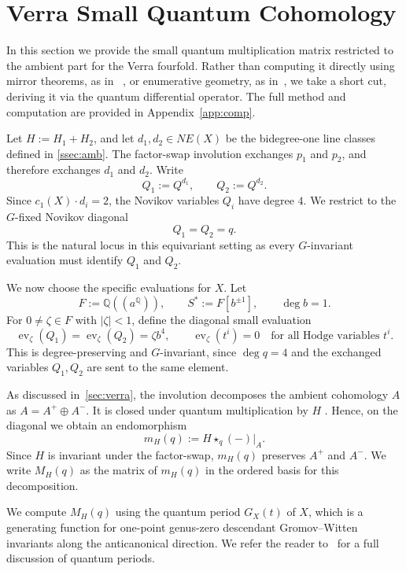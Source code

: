 \documentclass{amsart}
\theoremstyle{definition}
\theoremstyle{remark}
\newcommand{\QQ}{\mathbb Q}
\newcommand{\ev}{\operatorname{ev}}
\begin{document}
\section{Verra Small Quantum Cohomology}
\label{sec:ambient}
In this section we provide the small quantum multiplication matrix restricted to the ambient part
for the Verra fourfold. Rather than computing it directly using mirror theorems, as in ~\cite{Katzarkov2025BirationalIF}, or enumerative geometry, as in~\cite{Benedetti2026QuantumCA, Benedetti26Verra}, we take a short cut, deriving it via the quantum differential operator. The full method and computation are provided in Appendix~\ref{app:comp}.

Let \(H:=H_1+H_2\), and let \(d_1,d_2\in NE(X)\) be the bidegree-one line
classes defined in \cref{ssec:amb}. The factor-swap involution exchanges \(p_1\) and \(p_2\), and therefore exchanges
\(d_1\) and \(d_2\).  Write
\[
  Q_1:=Q^{d_1},
  \qquad
  Q_2:=Q^{d_2}.
\]
Since \(c_1(X)\cdot d_i=2\), the Novikov variables \(Q_i\) have degree \(4\). We restrict to the \(G\)-fixed Novikov diagonal
\[
  Q_1=Q_2=q.
\]
This is the natural locus in this equivariant setting as every \(G\)-invariant evaluation must identify \(Q_1\) and \(Q_2\).

We now choose the specific evaluations for \(X\). Let
\[
  F:=\QQ((a^\QQ)),
  \qquad
  S^*:=F[b^{\pm1}],
  \qquad
  \deg b=1.
\]
For \(0\ne\zeta\in F\) with \(|\zeta|<1\), define the diagonal small
evaluation
\[
  \ev_\zeta(Q_1)=\ev_\zeta(Q_2)=\zeta b^4,
  \qquad
  \ev_\zeta(t^i)=0
  \quad\text{for all Hodge variables }t^i.
\]
This is degree-preserving and \(G\)-invariant, since \(\deg q=4\)
and the exchanged variables \(Q_1,Q_2\) are sent to the same element.

As discussed in~\cref{sec:verra}, the involution decomposes the ambient cohomology $A$ as $A=A^+\oplus A^-$. It is closed under quantum multiplication by \(H\)
\cite[Corollary~2.5]{Iritani_2011}. Hence, on the diagonal we obtain an endomorphism
\[
  m_H(q):=H\star_q(-)|_A .
\]
Since \(H\) is invariant under the factor-swap, \(m_H(q)\) preserves \(A^+\) and
\(A^-\). We write \(M_H(q)\) as the matrix of \(m_H(q)\) in the ordered basis for this decomposition. 

We compute $M_H(q)$ using the quantum period \(G_X(t)\) of \(X\), which is a
generating function for one-point genus-zero descendant Gromov--Witten
invariants along the anticanonical direction. We refer the reader to~\citep{coates2014mirror} for a full discussion of quantum periods. 
\end{document}
